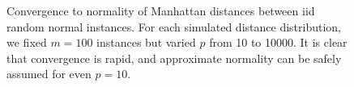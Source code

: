 \documentclass[10pt,letterpaper]{article}\usepackage[]{graphicx}\usepackage[]{color}
\begin{document}
\begin{figure}[ht!]
\centering
		\caption{Convergence to normality of Manhattan distances between iid random normal instances. For each simulated distance distribution, we fixed $m=100$ instances but varied $p$ from 10 to 10000. It is clear that convergence is rapid, and approximate normality can be safely assumed for even $p=10$.}\label{fig:manhattanConverge}
\end{figure} 
\end{document}
